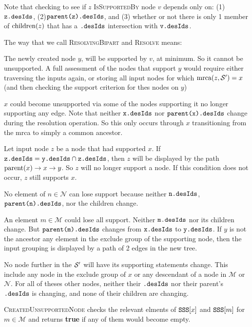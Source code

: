 \documentclass[11pt]{article}
\begin{document}
Note that checking to see if $z$ \textsc{IsSupportedBy} node $v$ depends only on:
    (1) $\texttt{{z}.desIds}$,
    (2)$\texttt{{\mbox{parent}(z)}.desIds}$, and 
    (3) whether or not there is only 1 member of $\mbox{children}(z)$ that has a $\texttt{{}.desIds}$ intersection  with $\texttt{{v}.desIds}$.

The way that we call \textsc{ResolvingBipart} and \textsc{Resolve} means:
\begin{compactenum}
    \item The newly created node $y$, will be supported by $v$, at minimum. So it cannot be unsupported.
    A full assessment of the nodes that support $y$ would require either traversing 
    the inputs again, or storing all input nodes for which $\mbox{mrca}(z, \mathcal{S}^{\prime}) = x$ 
    (and then checking the support criterion for thes nodes on $y$)
    \item $x$ could become unsupported via some of the nodes supporting it no longer supporting any edge.
    Note that neither $\texttt{{x}.desIds}$ nor  $\texttt{{\mbox{parent}(x)}.desIds}$ change during the resolution operation. 
    So this only occurs through $x$ transitioning from the mrca to simply a common ancestor.

    Let input node $z$ be a node that had supported $x$.
    If $\texttt{{z}.desIds} = \texttt{{y}.desIds} \cap \texttt{{z}.desIds}$, then
    $z$ will be displayed by the path $\mbox{parent}(x) \rightarrow x \rightarrow y$.
    So $z$ will no longer support a node. If this condition does not occur, $z$ still supports $x$.
    \item No element of $n\in \mathcal{N}$ can lose support because neither $\texttt{{n}.desIds}$, $\texttt{{\mbox{parent}(n)}.desIds}$, nor the children change.
    \item An element $m\in \mathcal{M}$ could lose all support. Neither $\texttt{{m}.desIds}$ nor its children change. But $\texttt{{\mbox{parent}(m)}.desIds}$ changes from $\texttt{{x}.desIds}$ to $\texttt{{y}.desIds}$.
    If $y$ is not the ancestor any element in the exclude group of the supporting node, then the
    input grouping is displayed by a path of 2 edges in the new tree.
    \item No node further in the $\mathcal{S}^{\prime}$ will have its supporting statements change. This include any node in the exclude group of $x$ or any descendant of a
    node in $\mathcal{M}$ or $\mathcal{N}$.
    For all of theses other nodes, neither their $\texttt{{}.desIds}$ nor their parent's $\texttt{{}.desIds}$ is changing, and none of their children are changing.
\end{compactenum}

\textsc{CreatedUnsupportedNode} checks the relevant elments of $\mbox{\texttt{SSS}}[x]$ and $\mbox{\texttt{SSS}}[m]$ for $m\in \mathcal{M}$ and
returns \textbf{true} if any of them would become empty.
\end{document}
